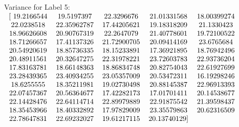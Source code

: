\documentclass[a4paper]{article}
\begin{document}
Variance for Label 5: 
$\begin{tabular}{  c c c c c  }
    [ 19.2166544  & 19.5197397  & 22.3296676  & 21.01331568 & 18.00399274 \\
      22.0238518  & 22.35962787 & 17.44205621 & 19.18318209 & 21.1330423 \\
      18.96626608 & 20.90767319 & 22.2647079  & 21.40778601 & 19.72100522 \\
      18.71266657 & 17.41137326 & 21.72900705 & 20.09414169 & 23.6765684 \\
      20.54920619 & 18.85736335 & 18.15233891 & 17.36921895 & 18.76942496 \\
      20.48911561 & 20.32647275 & 22.31978221 & 23.72603783 & 22.93736204 \\
      17.83163781 & 18.66148363 & 18.86834748 & 20.82754043 & 22.61927699 \\
      23.28439365 & 23.40934255 & 23.05357009 & 20.53472311 & 16.19298246 \\
      18.6255555  & 18.35211981 & 19.02730498 & 20.88145387 & 22.96913393 \\
      22.07457367 & 20.56364677 & 17.42282173 & 17.01701411 & 20.14538677 \\
      22.14428476 & 22.64114714 & 22.89979889 & 22.91875542 & 21.39598437 \\
      18.35453966 & 18.40332892 & 17.97829009 & 23.35579863 & 20.62316509 \\
      22.78647831 & 22.69232027 & 19.61217115 & 20.13740129] & \\
\end{tabular}$

\vspace{3mm}
\end{document}
